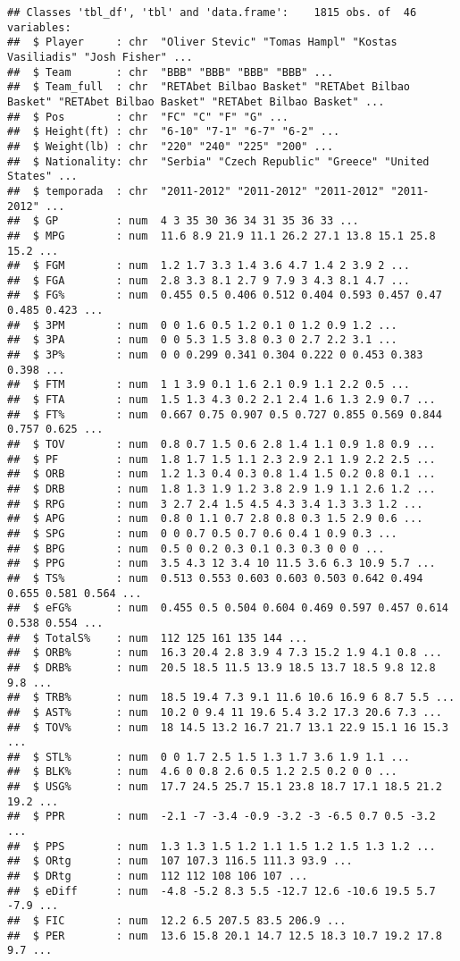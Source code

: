 \documentclass[]{article}
\begin{document}
\begin{verbatim}
## Classes 'tbl_df', 'tbl' and 'data.frame':    1815 obs. of  46 variables:
##  $ Player     : chr  "Oliver Stevic" "Tomas Hampl" "Kostas Vasiliadis" "Josh Fisher" ...
##  $ Team       : chr  "BBB" "BBB" "BBB" "BBB" ...
##  $ Team_full  : chr  "RETAbet Bilbao Basket" "RETAbet Bilbao Basket" "RETAbet Bilbao Basket" "RETAbet Bilbao Basket" ...
##  $ Pos        : chr  "FC" "C" "F" "G" ...
##  $ Height(ft) : chr  "6-10" "7-1" "6-7" "6-2" ...
##  $ Weight(lb) : chr  "220" "240" "225" "200" ...
##  $ Nationality: chr  "Serbia" "Czech Republic" "Greece" "United States" ...
##  $ temporada  : chr  "2011-2012" "2011-2012" "2011-2012" "2011-2012" ...
##  $ GP         : num  4 3 35 30 36 34 31 35 36 33 ...
##  $ MPG        : num  11.6 8.9 21.9 11.1 26.2 27.1 13.8 15.1 25.8 15.2 ...
##  $ FGM        : num  1.2 1.7 3.3 1.4 3.6 4.7 1.4 2 3.9 2 ...
##  $ FGA        : num  2.8 3.3 8.1 2.7 9 7.9 3 4.3 8.1 4.7 ...
##  $ FG%        : num  0.455 0.5 0.406 0.512 0.404 0.593 0.457 0.47 0.485 0.423 ...
##  $ 3PM        : num  0 0 1.6 0.5 1.2 0.1 0 1.2 0.9 1.2 ...
##  $ 3PA        : num  0 0 5.3 1.5 3.8 0.3 0 2.7 2.2 3.1 ...
##  $ 3P%        : num  0 0 0.299 0.341 0.304 0.222 0 0.453 0.383 0.398 ...
##  $ FTM        : num  1 1 3.9 0.1 1.6 2.1 0.9 1.1 2.2 0.5 ...
##  $ FTA        : num  1.5 1.3 4.3 0.2 2.1 2.4 1.6 1.3 2.9 0.7 ...
##  $ FT%        : num  0.667 0.75 0.907 0.5 0.727 0.855 0.569 0.844 0.757 0.625 ...
##  $ TOV        : num  0.8 0.7 1.5 0.6 2.8 1.4 1.1 0.9 1.8 0.9 ...
##  $ PF         : num  1.8 1.7 1.5 1.1 2.3 2.9 2.1 1.9 2.2 2.5 ...
##  $ ORB        : num  1.2 1.3 0.4 0.3 0.8 1.4 1.5 0.2 0.8 0.1 ...
##  $ DRB        : num  1.8 1.3 1.9 1.2 3.8 2.9 1.9 1.1 2.6 1.2 ...
##  $ RPG        : num  3 2.7 2.4 1.5 4.5 4.3 3.4 1.3 3.3 1.2 ...
##  $ APG        : num  0.8 0 1.1 0.7 2.8 0.8 0.3 1.5 2.9 0.6 ...
##  $ SPG        : num  0 0 0.7 0.5 0.7 0.6 0.4 1 0.9 0.3 ...
##  $ BPG        : num  0.5 0 0.2 0.3 0.1 0.3 0.3 0 0 0 ...
##  $ PPG        : num  3.5 4.3 12 3.4 10 11.5 3.6 6.3 10.9 5.7 ...
##  $ TS%        : num  0.513 0.553 0.603 0.603 0.503 0.642 0.494 0.655 0.581 0.564 ...
##  $ eFG%       : num  0.455 0.5 0.504 0.604 0.469 0.597 0.457 0.614 0.538 0.554 ...
##  $ TotalS%    : num  112 125 161 135 144 ...
##  $ ORB%       : num  16.3 20.4 2.8 3.9 4 7.3 15.2 1.9 4.1 0.8 ...
##  $ DRB%       : num  20.5 18.5 11.5 13.9 18.5 13.7 18.5 9.8 12.8 9.8 ...
##  $ TRB%       : num  18.5 19.4 7.3 9.1 11.6 10.6 16.9 6 8.7 5.5 ...
##  $ AST%       : num  10.2 0 9.4 11 19.6 5.4 3.2 17.3 20.6 7.3 ...
##  $ TOV%       : num  18 14.5 13.2 16.7 21.7 13.1 22.9 15.1 16 15.3 ...
##  $ STL%       : num  0 0 1.7 2.5 1.5 1.3 1.7 3.6 1.9 1.1 ...
##  $ BLK%       : num  4.6 0 0.8 2.6 0.5 1.2 2.5 0.2 0 0 ...
##  $ USG%       : num  17.7 24.5 25.7 15.1 23.8 18.7 17.1 18.5 21.2 19.2 ...
##  $ PPR        : num  -2.1 -7 -3.4 -0.9 -3.2 -3 -6.5 0.7 0.5 -3.2 ...
##  $ PPS        : num  1.3 1.3 1.5 1.2 1.1 1.5 1.2 1.5 1.3 1.2 ...
##  $ ORtg       : num  107 107.3 116.5 111.3 93.9 ...
##  $ DRtg       : num  112 112 108 106 107 ...
##  $ eDiff      : num  -4.8 -5.2 8.3 5.5 -12.7 12.6 -10.6 19.5 5.7 -7.9 ...
##  $ FIC        : num  12.2 6.5 207.5 83.5 206.9 ...
##  $ PER        : num  13.6 15.8 20.1 14.7 12.5 18.3 10.7 19.2 17.8 9.7 ...
\end{verbatim}
\end{document}
